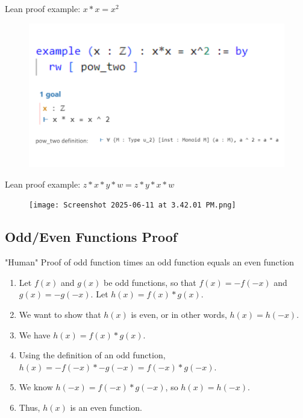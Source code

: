\documentclass[xcolor=dvipsnames]{beamer}
\begin{document}
\begin{frame}{Lean proof example: $x*x = x^2$}
\begin{figure}
    \centering
    \includegraphics[scale=0.32]{xtimesxequalsx2.png}
\end{figure}
\end{frame}

\begin{frame}{Lean proof example: $z*x*y*w=z*y*x*w$}

\begin{figure}
    \centering
    \texttt{[image: Screenshot 2025-06-11 at 3.42.01 PM.png]}
\end{figure}

\end{frame}


\subsection{Odd/Even Functions Proof}

\begin{frame}{"Human" Proof of odd function times an odd function equals an even function}
\begin{enumerate}
\item Let $f(x)$ and $g(x)$ be odd functions, so that $f(x) = -f(-x)$ and $g(x) = -g(-x)$. Let $h(x) = f(x)*g(x)$. 
\item We want to show that $h(x)$ is even, or in other words, $h(x) = h(-x)$.
\item We have $h(x) = f(x) * g(x)$.
\item Using the definition of an odd function, $h(x) = -f(-x) * -g(-x)=f(-x)*g(-x)$.
\item We know $h(-x)= f(-x)*g(-x)$, so $h(x)=h(-x)$.
\item Thus, $h(x)$ is an even function.
\end{enumerate}
\end{frame}
\end{document}
